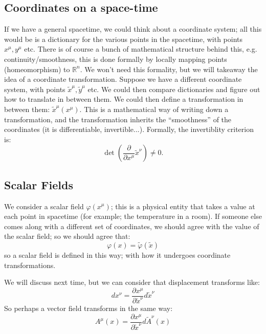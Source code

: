 \subsection{Coordinates on a space-time}
If we have a general spacetime, we could think about a coordinate system; all this would be is a dictionary for the various points in the spacetime, with points $x^\mu, y^\mu$ etc. There is of course a bunch of mathematical structure behind this, e.g. continuity/smoothness, this is done formally by locally mapping points (homeomorphism) to $\mathbb{R}^n$. We won't need this formality, but we will takeaway the idea of a coordinate transformation. Suppose we have a different coordinate system, with points $\tilde{x}^\mu, \tilde{y}^\mu$ etc. We could then compare dictionaries and figure out how to translate in between them. We could then define a transformation in between them: $\tilde{x}^\mu(x^\mu)$. This is a mathematical way of writing down a transformation, and the transformation inherits the ``smoothness'' of the coordinates (it is differentiable, invertible...). Formally, the invertiblity criterion is:
\begin{equation}
    \det(\frac{\partial }{\partial x^\mu}\tilde{x}^\nu) \neq 0.
\end{equation}

\subsection{Scalar Fields}
We consider a scalar field $\varphi(x^\mu)$; this is a physical entity that takes a value at each point in spacetime (for example; the temperature in a room). If someone else comes along with a different set of coordinates, we should agree with the value of the scalar field; so we should agree that:
\begin{equation}
    \varphi(x) = \tilde{\varphi}(\tilde{x})
\end{equation}
so a scalar field is defined in this way; with how it undergoes coordinate transformations.

We will discuss next time, but we can consider that displacement transforms like:
\begin{equation}
    dx^\nu = \frac{\partial x^\mu}{\partial \tilde{x}^\nu}d\tilde{x}^\nu
\end{equation}
So perhaps a vector field transforms in the same way:
\begin{equation}
    A^\mu(x) = \frac{\partial x^\mu}{\partial \tilde{x}^\nu} d\tilde{A}^\nu(x)
\end{equation}